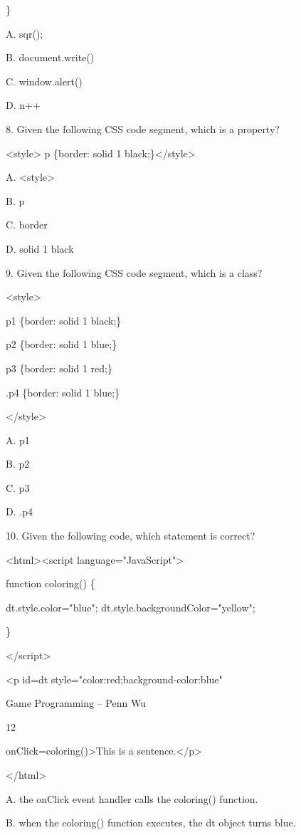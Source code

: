 \documentclass[
]{article}
\begin{document}
\}

A. sqr();

B. document.write()

C. window.alert()

D. n++

8. Given the following CSS code segment, which is a property?

\textless style\textgreater{} p \{border: solid 1
black;\}\textless/style\textgreater{}

A. \textless style\textgreater{}

B. p

C. border

D. solid 1 black

9. Given the following CSS code segment, which is a class?

\textless style\textgreater{}

p1 \{border: solid 1 black;\}

p2 \{border: solid 1 blue;\}

p3 \{border: solid 1 red;\}

.p4 \{border: solid 1 blue;\}

\textless/style\textgreater{}

A. p1

B. p2

C. p3

D. .p4

10. Given the following code, which statement is correct?

\textless html\textgreater\textless script
language="JavaScript"\textgreater{}

function coloring() \{

dt.style.color="blue"; dt.style.backgroundColor="yellow";

\}

\textless/script\textgreater{}

\textless p id=dt style="color:red;background-color:blue"

Game Programming -- Penn Wu

12

\protect\hypertarget{index_split_001.htmlux5cux23p13}{}{}onClick=coloring()\textgreater This
is a sentence.\textless/p\textgreater{}

\textless/html\textgreater{}

A. the onClick event handler calls the coloring() function.

B. when the coloring() function executes, the dt object turns blue.
\end{document}
